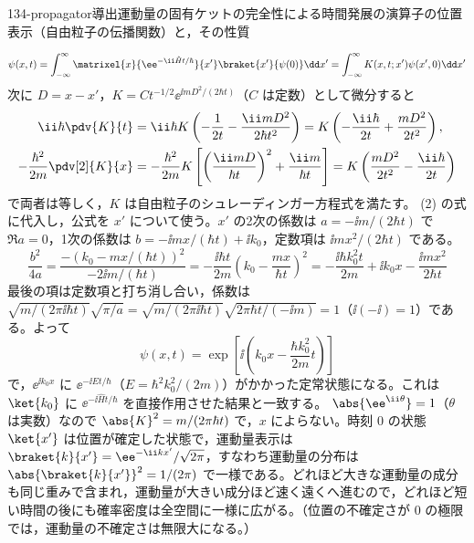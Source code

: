 \documentclass[uplatex,dvipdfmx,a4paper,11pt]{jsarticle}
\begin{document}
\begin{mondai}{134-propagator}{導出}{運動量の固有ケットの完全性による時間発展の演算子の位置表示（自由粒子の伝播関数）と，その性質}
\begin{tadashii}
\[ \psi(x,t)=\int_{-\infty}^{\infty}\matrixel{x}{\ee^{-\ii\hat{H}t/\hbar}}{x'}\braket{x'}{\psi(0)}\dd x'=\int_{-\infty}^{\infty}K(x,t;x')\psi(x',0)\dd x' \]
次に $D=x-x'$，$K=Ct^{-1/2}\ee^{\ii mD^{2}/(2\hbar t)}$（$C$ は定数）として微分すると
\begin{align*}
  \ii\hbar\pdv{K}{t}&=\ii\hbar K\left(-\frac{1}{2t}-\frac{\ii mD^{2}}{2\hbar t^{2}}\right)=K\left(-\frac{\ii\hbar}{2t}+\frac{mD^{2}}{2t^{2}}\right),\\
  -\frac{\hbar^{2}}{2m}\pdv[2]{K}{x}&=-\frac{\hbar^{2}}{2m}K\left[\left(\frac{\ii mD}{\hbar t}\right)^{2}+\frac{\ii m}{\hbar t}\right]=K\left(\frac{mD^{2}}{2t^{2}}-\frac{\ii\hbar}{2t}\right)
\end{align*}
で両者は等しく，$K$ は自由粒子のシュレーディンガー方程式を満たす。
 (2) の式に代入し，公式を $x'$ について使う。$x'$ の2次の係数は $a=-\ii m/(2\hbar t)$ で $\Re a=0$，1次の係数は $b=-\ii mx/(\hbar t)+\ii k_{0}$，定数項は $\ii mx^{2}/(2\hbar t)$ である。
\[ \frac{b^{2}}{4a}=\frac{-(k_{0}-mx/(\hbar t))^{2}}{-2\ii m/(\hbar t)}=-\frac{\ii\hbar t}{2m}\left(k_{0}-\frac{mx}{\hbar t}\right)^{2}=-\frac{\ii\hbar k_{0}^{2}t}{2m}+\ii k_{0}x-\frac{\ii mx^{2}}{2\hbar t} \]
最後の項は定数項と打ち消し合い，係数は $\sqrt{m/(2\pi\ii\hbar t)}\sqrt{\pi/a}=\sqrt{m/(2\pi\ii\hbar t)}\sqrt{2\pi\hbar t/(-\ii m)}=1$（$\ii(-\ii)=1$）である。よって
\[ \psi(x,t)=\exp\left[\ii\left(k_{0}x-\frac{\hbar k_{0}^{2}}{2m}t\right)\right] \]
で，$\ee^{\ii k_{0}x}$ に $\ee^{-\ii Et/\hbar}$（$E=\hbar^{2}k_{0}^{2}/(2m)$）がかかった定常状態になる。これは $\ket{k_{0}}$ に $\ee^{-\ii\hat{H}t/\hbar}$ を直接作用させた結果と一致する。
 $\abs{\ee^{\ii\theta}}=1$（$\theta$ は実数）なので $\abs{K}^{2}=m/(2\pi\hbar t)$ で，$x$ によらない。時刻 $0$ の状態 $\ket{x'}$ は位置が確定した状態で，運動量表示は $\braket{k}{x'}=\ee^{-\ii kx'}/\sqrt{2\pi}$，すなわち運動量の分布は $\abs{\braket{k}{x'}}^{2}=1/(2\pi)$ で一様である。どれほど大きな運動量の成分も同じ重みで含まれ，運動量が大きい成分ほど速く遠くへ進むので，どれほど短い時間の後にも確率密度は全空間に一様に広がる。（位置の不確定さが $0$ の極限では，運動量の不確定さは無限大になる。）

\end{tadashii}
\end{mondai}
\end{document}
